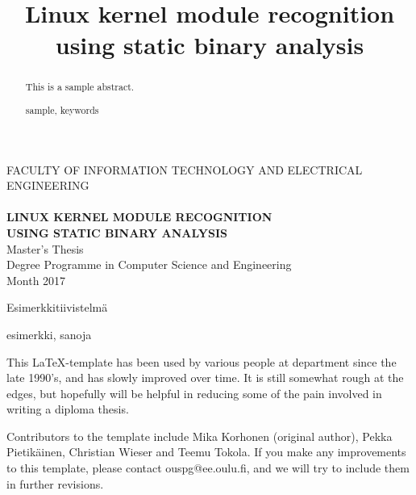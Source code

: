 \documentclass[a4paper, 12pt,titlepage]{dithesis}
\title{Linux kernel module recognition using static binary analysis}
\begin{document}
\begin{titlepage}
	{\sffamily\fontsize{9}{1pt}\selectfont FACULTY OF INFORMATION TECHNOLOGY AND ELECTRICAL ENGINEERING\\}
	\vspace{65 mm}
	{\textbf{\fontsize{16}{19pt}\selectfont \getfirstname\ \getlastname }\\}
	\vspace{15 mm}
	{\textbf{\fontsize{18}{22pt}\selectfont LINUX KERNEL MODULE RECOGNITION\\USING STATIC BINARY ANALYSIS\\}}
	\vspace{60 mm}
	{\fontsize{14}{17}\selectfont Master's Thesis \\Degree Programme in Computer Science and Engineering \\ Month 2017\\}
\end{titlepage}


\begin{abstract}
This is a sample abstract.

\keywords sample, keywords

\end{abstract}

\begin{tiivistelma}
Esimerkkitiivistelmä

\avainsanat esimerkki, sanoja
\end{tiivistelma}


\sisluettelo

This \LaTeX -template has been used by various people at department
since the late 1990's, and has slowly improved over time.  It is still
somewhat rough at the edges, but hopefully will be helpful in reducing
some of the pain involved in writing a diploma thesis.

Contributors to the template include Mika Korhonen (original author),
Pekka Pietikäinen, Christian Wieser and Teemu Tokola.  If you make any
improvements to this template, please contact ouspg@ee.oulu.fi, and we
will try to include them in further revisions.
\end{document}
